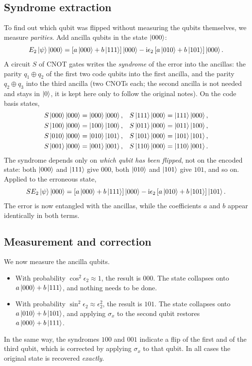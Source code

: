\subsection{Syndrome extraction}
To find out which qubit was flipped without measuring the qubits themselves, we measure \emph{parities}. Add ancilla qubits in the state $\left|000\right\rangle$:
\begin{equation}
  E_2\left|\psi\right\rangle\left|000\right\rangle=\left[a\left|000\right\rangle+b\left|111\right\rangle\right]\left|000\right\rangle-\mathrm i\epsilon_2\left[a\left|010\right\rangle+b\left|101\right\rangle\right]\left|000\right\rangle.
\end{equation}
A circuit $S$ of CNOT gates writes the \emph{syndrome} of the error into the ancillas: the parity $q_1\oplus q_2$ of the first two code qubits into the first ancilla, and the parity $q_2\oplus q_3$ into the third ancilla
(two CNOTs each; the second ancilla is not needed and stays in $\left|0\right\rangle$, it is kept here only to follow the original notes). On the code basis states,
\begin{align}
  S\left|000\right\rangle\left|000\right\rangle&=\left|000\right\rangle\left|000\right\rangle,& S\left|111\right\rangle\left|000\right\rangle&=\left|111\right\rangle\left|000\right\rangle,\nonumber\\
  S\left|100\right\rangle\left|000\right\rangle&=\left|100\right\rangle\left|100\right\rangle,& S\left|011\right\rangle\left|000\right\rangle&=\left|011\right\rangle\left|100\right\rangle,\nonumber\\
  S\left|010\right\rangle\left|000\right\rangle&=\left|010\right\rangle\left|101\right\rangle,& S\left|101\right\rangle\left|000\right\rangle&=\left|101\right\rangle\left|101\right\rangle,\nonumber\\
  S\left|001\right\rangle\left|000\right\rangle&=\left|001\right\rangle\left|001\right\rangle,& S\left|110\right\rangle\left|000\right\rangle&=\left|110\right\rangle\left|001\right\rangle.
\end{align}
The syndrome depends only on \emph{which qubit has been flipped}, not on the encoded state: both $\left|000\right\rangle$ and $\left|111\right\rangle$ give $000$, both $\left|010\right\rangle$ and $\left|101\right\rangle$ give $101$, and so on. Applied to the erroneous state,
\begin{equation}
  SE_2\left|\psi\right\rangle\left|000\right\rangle=\left[a\left|000\right\rangle+b\left|111\right\rangle\right]\left|000\right\rangle-\mathrm i\epsilon_2\left[a\left|010\right\rangle+b\left|101\right\rangle\right]\left|101\right\rangle.
\end{equation}
The error is now entangled with the ancillas, while the coefficients $a$ and $b$ appear identically in both terms.

\subsection{Measurement and correction}
We now measure the ancilla qubits.
\begin{itemize}
  \item With probability $\cos^2\epsilon_2\approx1$, the result is $000$. The state collapses onto $a\left|000\right\rangle+b\left|111\right\rangle$, and nothing needs to be done.
  \item With probability $\sin^2\epsilon_2\approx\epsilon_2^2$, the result is $101$. The state collapses onto $a\left|010\right\rangle+b\left|101\right\rangle$, and applying $\sigma_x$ to the second qubit restores $a\left|000\right\rangle+b\left|111\right\rangle$.
\end{itemize}
In the same way, the syndromes $100$ and $001$ indicate a flip of the first and of the third qubit, which is corrected by applying $\sigma_x$ to that qubit. In all cases the original state is recovered \emph{exactly}.

